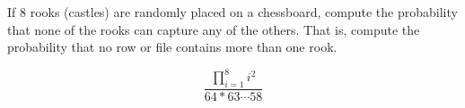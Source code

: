 \item If 8 rooks (castles) are randomly placed on a chessboard, compute the probability that none of the rooks can capture any of the others. That is, compute the probability that no row or file contains more than one rook.

\[ \dfrac{\prod_{i=1}^8 i^2}{64*63\cdots58} \]